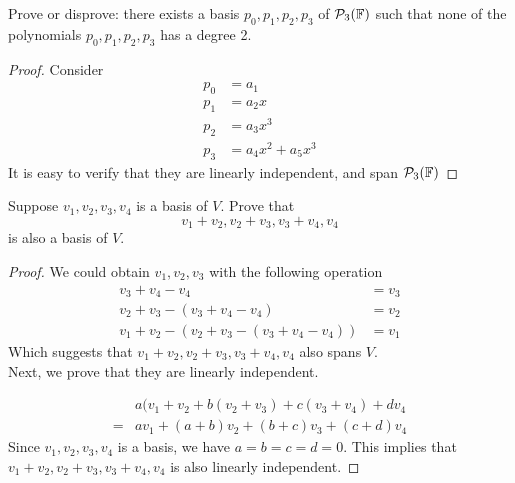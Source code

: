 \begin{exercise}
Prove or disprove: there exists a basis \(p_0, p_1, p_2, p_3\) of \(\mathcal{P}_3 (\mathbb{F})\)
such that none of the polynomials \(p_0, p_1, p_2, p_3\) has a degree 2.
\end{exercise}
\begin{proof}
	Consider
	\begin{align*}
		p_0 & = a_1               \\
		p_1 & = a_2 x             \\
		p_2 & = a_3 x^3           \\
		p_3 & = a_4 x^2 + a_5 x^3
	\end{align*}
	It is easy to verify that they are linearly independent, and span $\mathcal{P}_3(\mathbb{F})$
\end{proof}

\begin{exercise}
Suppose \(v_{1}, v_{2}, v_{3}, v_{4}\) is a basis of $V$. Prove that \[
	v_{1} + v_{2}, v_{2} + v_{3}, v_{3} + v_{4}, v_{4}\]
is also a basis of $V$.
\end{exercise}
\begin{proof}
	We could obtain \(v_{1}, v_{2}, v_{3}\) with the following operation
	\begin{align}
		v_{3} + v_{4} - v_{4}                                     & = v_{3} \\
		v_{2} + v_{3} - (v_{3} + v_{4} - v_{4})                   & = v_{2} \\
		v_{1} + v_{2} - (v_{2} + v_{3} - (v_{3} + v_{4} - v_{4})) & = v_{1}
	\end{align}
	Which suggests that \(v_{1} + v_{2}, v_{2} + v_{3}, v_{3} + v_{4}, v_{4}\)
	also spans $V$. \\
	Next, we prove that they are linearly independent.

	\begin{align}
		  & a(v_{1} + v_{2} + b ( v_{2} + v_{3} ) + c (v_{3} + v_{4}) + d v_{4} \\
		= & a v_{1} + (a + b) v_{2} + (b + c) v_{3} + (c + d) v_{4}
	\end{align}
	Since \(v_{1}, v_{2}, v_{3}, v_{4}\) is a basis, we have \(a = b = c = d = 0\).
	This implies that \(v_{1} + v_{2}, v_{2} + v_{3}, v_{3} + v_{4}, v_{4}\)
	is also linearly independent.
\end{proof}

